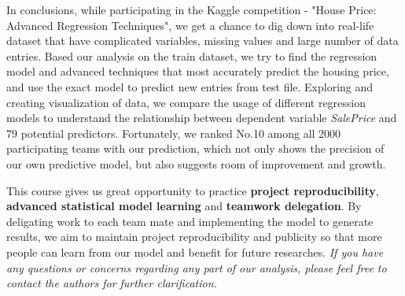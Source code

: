 \documentclass[a4paper]{article}
\begin{document}
\begin{flushleft}
In conclusions, while participating in the Kaggle competition - "House Price: Advanced Regression Techniques", we get a chance to dig down into real-life dataset that have complicated variables, missing values and large number of data entries. Based our analysis on the train dataset, we try to find the regression model and advanced techniques that most accurately predict the housing price, and use the exact model to predict new entries from test file. Exploring and creating visualization of data, we compare the usage of different regression models to understand the relationship between dependent variable \textit{SalePrice} and 79 potential predictors. Fortunately, we ranked No.10 among all 2000 participating teams with our prediction, which not only shows the precision of our own predictive model, but also suggests room of improvement and growth. \newline

This course gives us great opportunity to practice \textbf{project reproducibility}, \textbf{advanced statistical model learning} and \textbf{teamwork delegation}. By deligating work to each team mate and implementing the model to generate results, we aim to maintain project reproducibility and publicity so that more people can learn from our model and benefit for future researches. \textit{If you have any questions or concerns regarding any part of our analysis, please feel free to contact the authors for further clarification.} \newline

\end{flushleft}
\end{document}
